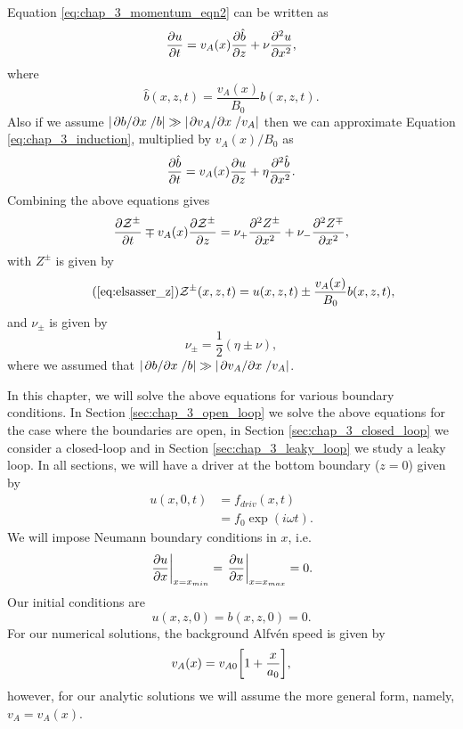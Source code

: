 Equation \eqref{eq:chap_3_momentum_eqn2} can be written as
\[\pdv{u}{t}=v_A(x)\pdv{\hat{b}}{z}+\nu\pdv[2]{u}{x},\]
where
\begin{equation}
    \hat{b}(x,z,t) = \frac{v_A(x)}{B_0}b(x,z,t).
\end{equation}
Also if we assume $\abs{\pdv*{b}{x}/b}\gg\abs{\pdv*{v_A}{x}/v_A}$ then we can approximate Equation \eqref{eq:chap_3_induction}, multiplied by $v_A(x)/B_0$ as 
\[\pdv{\hat{b}}{t}=v_A(x)\pdv{u}{z}+\eta\pdv[2]{\hat{b}}{x}.\]
Combining the above equations gives
\begin{equation}
    \label{eq:advection_diffusion_elsasser}
    \pdv{\mathcal{Z}^\pm}{t} \mp  v_A(x)\pdv{\mathcal{Z}^\pm}{z} = \nu_+ \pdv[2]{Z^\pm}{x} + \nu_-\pdv[2]{Z^\mp}{x},
\end{equation}
with $Z^{\pm}$ is given by 
\begin{equation}
    \tag{\ref{eq:elsasser_z}}
    \mathcal{Z}^\pm(x,z,t) = u(x,z,t) \pm \frac{v_A(x)}{B_0}b(x,z,t),
\end{equation}
and $\nu_{\pm}$ is given by
\begin{equation}
    \nu_\pm = \frac{1}{2}(\eta\pm\nu),
\end{equation}
where we assumed that $\abs{\pdv*{b}{x}/b}\gg\abs{\pdv*{v_A}{x}/v_A}$.

In this chapter, we will solve the above equations for various boundary conditions. In Section \ref{sec:chap_3_open_loop} we solve the above equations for the case where the boundaries are open, in Section \ref{sec:chap_3_closed_loop} we consider a closed-loop and in Section \ref{sec:chap_3_leaky_loop} we study a leaky loop. In all sections, we will have a driver at the bottom boundary ($z=0$) given by
\begin{equation}
    \label{eq:driver_chap_3}
    \begin{aligned}
    u(x,0,t) &= f_{driv}(x,t) \\
    &= f_0\exp(i\omega t).
    \end{aligned}
\end{equation}
We will impose Neumann boundary conditions in $x$, i.e.
\begin{equation}
    \label{eq:neumann_bcs_chap_3}
    \left.\pdv{u}{x}\right|_{x=x_{min}}=\left.\pdv{u}{x}\right|_{x=x_{max}}=0.
\end{equation}
Our initial conditions are
\begin{equation}
    u(x,z,0) = b(x,z,0) = 0.
\end{equation}
For our numerical solutions, the background Alfv\'en speed is given by
\begin{equation}
    \label{eq:background_vA_chap_3}
    v_A(x) = v_{A0}\qty[1 + \frac{x}{a_0}],
\end{equation}
however, for our analytic solutions we will assume the more general form, namely, $v_A=v_A(x)$.

